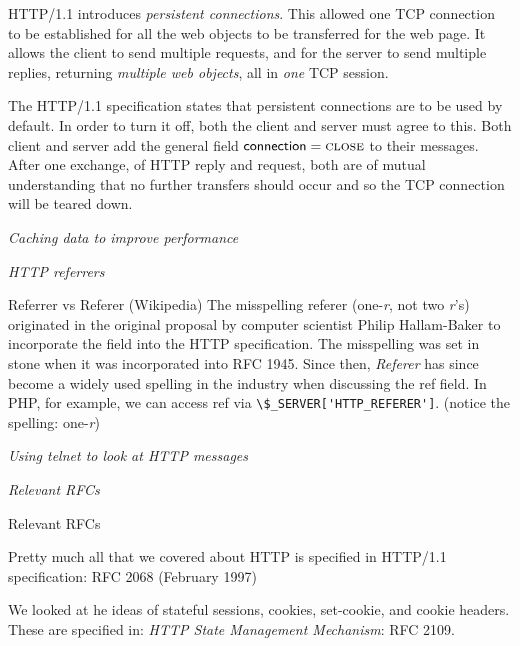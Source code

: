 HTTP/1.1 introduces \textit{persistent connections}. 
This allowed one TCP connection to be established for all 
the web objects to be transferred for the web page.
It allows the client to send multiple requests, and for the server to 
send multiple replies, returning \textit{multiple web objects}, 
all in \textit{one} TCP session. 


The HTTP/1.1 specification states that persistent connections 
are to be used by default. In order to turn it off, 
both the client and server must agree to this. 
Both client and server add the general field
$\mathsf{connection} = \textsc{close}$ to their messages.
After one exchange, of HTTP reply and request, both are 
of mutual understanding that no further transfers should 
occur and so the TCP connection will be teared down. 

\frmrule 

\textit{Caching data to improve performance}

\frmrule 

\textit{HTTP referrers}


\begin{sidenote}{Referrer vs Referer}
(Wikipedia)
The misspelling referer (one-\textit{r}, not two \textit{r}'s) originated in 
the original proposal by computer scientist Philip Hallam-Baker to incorporate 
the field into the HTTP specification. 
The misspelling was set in stone when it was incorporated into RFC 1945.  Since 
then, \textit{Referer} has since become a widely used spelling in the industry when discussing 
the \textsf{ref} field. 
In PHP, for example, we can access \textsf{ref} via \lstinline{\$_SERVER['HTTP_REFERER']}. (notice 
the spelling: one-\textit{r})
\end{sidenote}

\frmrule 

\textit{Using telnet to look at HTTP messages}


\frmrule 

\textit{Relevant RFCs}

\begin{sidenote}{Relevant RFCs}

Pretty much all that we covered about HTTP is specified in HTTP/1.1 specification: RFC 2068 (February 1997)

We looked at he ideas of stateful sessions, cookies, set-cookie, and cookie 
headers. These are specified in: \textit{HTTP State Management Mechanism}: RFC 2109.
\end{sidenote}




